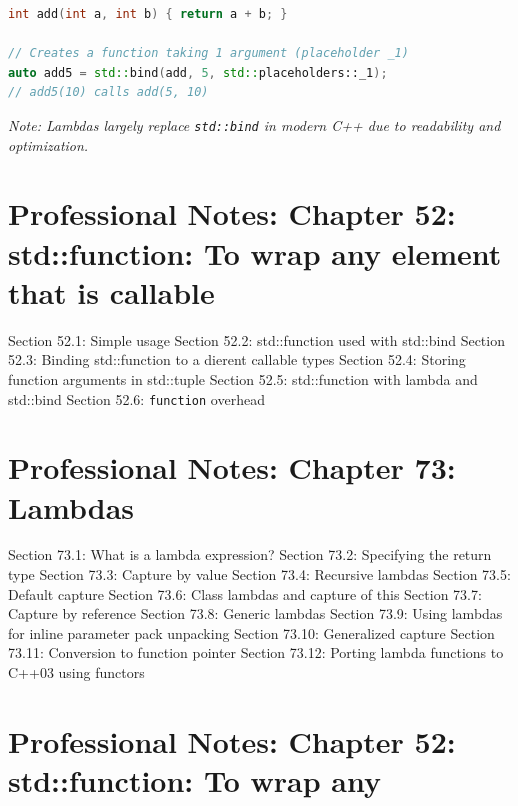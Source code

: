 \begin{lstlisting}[language={C++}]
int add(int a, int b) { return a + b; }

// Creates a function taking 1 argument (placeholder _1)
auto add5 = std::bind(add, 5, std::placeholders::_1);
// add5(10) calls add(5, 10)
\end{lstlisting}

\emph{Note: Lambdas largely replace \passthrough{\lstinline!std::bind!}
in modern C++ due to readability and optimization.}

\hypertarget{professional-notes-chapter-52-stdfunction-to-wrap-any-element-that-is-callable}{%
\section{Professional Notes: Chapter 52: std::function: To wrap any
element that is
callable}\label{professional-notes-chapter-52-stdfunction-to-wrap-any-element-that-is-callable}}

Section 52.1: Simple usage Section 52.2: std::function used with
std::bind Section 52.3: Binding std::function to a dierent callable
types Section 52.4: Storing function arguments in std::tuple Section
52.5: std::function with lambda and std::bind Section 52.6:
\passthrough{\lstinline!function!} overhead

\hypertarget{professional-notes-chapter-73-lambdas}{%
\section{Professional Notes: Chapter 73:
Lambdas}\label{professional-notes-chapter-73-lambdas}}

Section 73.1: What is a lambda expression? Section 73.2: Specifying the
return type Section 73.3: Capture by value Section 73.4: Recursive
lambdas Section 73.5: Default capture Section 73.6: Class lambdas and
capture of this Section 73.7: Capture by reference Section 73.8: Generic
lambdas Section 73.9: Using lambdas for inline parameter pack unpacking
Section 73.10: Generalized capture Section 73.11: Conversion to function
pointer Section 73.12: Porting lambda functions to C++03 using functors

\hypertarget{professional-notes-chapter-52-stdfunction-to-wrap-any}{%
\section{Professional Notes: Chapter 52: std::function: To wrap
any}\label{professional-notes-chapter-52-stdfunction-to-wrap-any}}

